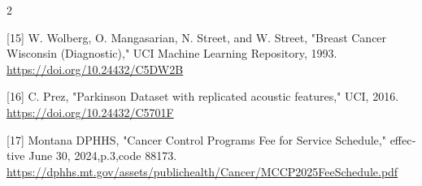 \documentclass[10pt,a4paper]{article}
\begin{document}
\begin{multicols}{2}
\begin{minipage}{\linewidth}{\fontsize{7}{8.2}\selectfont \begin{latin}[15] W. Wolberg, O. Mangasarian, N. Street, and W. Street, "Breast Cancer Wisconsin (Diagnostic)," UCI Machine Learning Repository, 1993. \url{https://doi.org/10.24432/C5DW2B}\end{latin}\par}\end{minipage}\par
\begin{minipage}{\linewidth}{\fontsize{7}{8.2}\selectfont \begin{latin}[16] C. Prez, "Parkinson Dataset with replicated acoustic features," UCI, 2016. \url{https://doi.org/10.24432/C5701F}\end{latin}\par}\end{minipage}\par
\begin{minipage}{\linewidth}{\fontsize{7}{8.2}\selectfont \begin{latin}[17] Montana DPHHS, "Cancer Control Programs Fee for Service Schedule," effective June 30, 2024,p.3,code 88173. \url{https://dphhs.mt.gov/assets/publichealth/Cancer/MCCP2025FeeSchedule.pdf}\end{latin}\par}\end{minipage}\par
\end{multicols}
\end{document}
